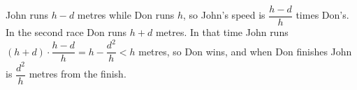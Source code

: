 John runs $h-d$ metres while Don runs $h$, so John's speed is $\dfrac{h-d}{h}$ times Don's. In the second race Don runs $h+d$ metres. In that time John runs $(h+d)\cdot\dfrac{h-d}{h}=h-\dfrac{d^2}{h}<h$ metres, so Don wins, and when Don finishes John is $\boxed{\dfrac{d^2}{h}}$ metres from the finish.

